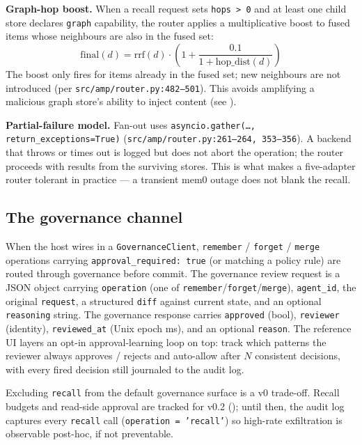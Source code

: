 \documentclass[11pt,letterpaper,twocolumn]{article}
\begin{document}
\textbf{Graph-hop boost.} When a recall request sets \texttt{hops > 0} and at least one child store declares \texttt{graph} capability, the router applies a multiplicative boost to fused items whose neighbours are also in the fused set:
\[
  \mathrm{final}(d) = \mathrm{rrf}(d) \cdot \left(1 + \frac{0.1}{1 + \mathrm{hop\_dist}(d)}\right)
\]
The boost only fires for items already in the fused set; new neighbours are not introduced (per \texttt{src/amp/router.py:482--501}). This avoids amplifying a malicious graph store's ability to inject content (see ).

\textbf{Partial-failure model.} Fan-out uses \texttt{asyncio.gather(\ldots, return\_exceptions=True)} (\texttt{src/amp/router.py:261--264, 353--356}). A backend that throws or times out is logged but does not abort the operation; the router proceeds with results from the surviving stores. This is what makes a five-adapter router tolerant in practice --- a transient mem0 outage does not blank the recall.

\subsection{The governance channel}
\label{sec:spec-governance}

When the host wires in a \texttt{GovernanceClient}, \texttt{remember} / \texttt{forget} / \texttt{merge} operations carrying \texttt{approval\_required: true} (or matching a policy rule) are routed through governance before commit. The governance review request is a JSON object carrying \texttt{operation} (one of \texttt{remember}/\texttt{forget}/\texttt{merge}), \texttt{agent\_id}, the original \texttt{request}, a structured \texttt{diff} against current state, and an optional \texttt{reasoning} string. The governance response carries \texttt{approved} (bool), \texttt{reviewer} (identity), \texttt{reviewed\_at} (Unix epoch ms), and an optional \texttt{reason}. The reference UI layers an opt-in approval-learning loop on top: track which patterns the reviewer always approves / rejects and auto-allow after $N$ consistent decisions, with every fired decision still journaled to the audit log.

Excluding \texttt{recall} from the default governance surface is a v0 trade-off. Recall budgets and read-side approval are tracked for v0.2 (); until then, the audit log captures every \texttt{recall} call (\texttt{operation = 'recall'}) so high-rate exfiltration is observable post-hoc, if not preventable.
\end{document}

